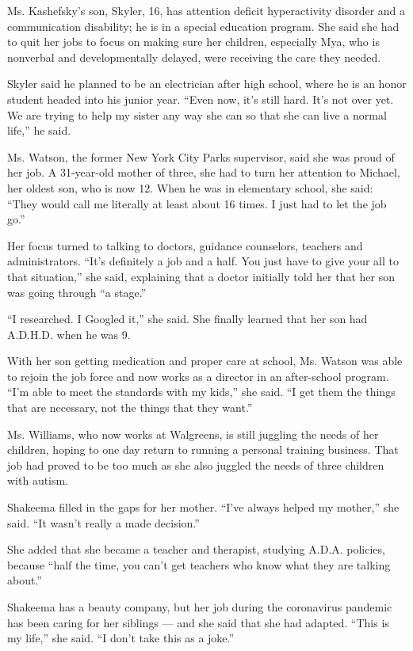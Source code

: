 Ms. Kashefsky's son, Skyler, 16, has attention deficit hyperactivity
disorder and a communication disability; he is in a special education
program. She said she had to quit her jobs to focus on making sure her
children, especially Mya, who is nonverbal and developmentally delayed,
were receiving the care they needed.

Skyler said he planned to be an electrician after high school, where he
is an honor student headed into his junior year. ``Even now, it's still
hard. It's not over yet. We are trying to help my sister any way she can
so that she can live a normal life,'' he said.

Ms. Watson, the former New York City Parks supervisor, said she was
proud of her job. A 31-year-old mother of three, she had to turn her
attention to Michael, her oldest son, who is now 12. When he was in
elementary school, she said: ``They would call me literally at least
about 16 times. I just had to let the job go.''

Her focus turned to talking to doctors, guidance counselors, teachers
and administrators. ``It's definitely a job and a half. You just have to
give your all to that situation,'' she said, explaining that a doctor
initially told her that her son was going through ``a stage.''

``I researched. I Googled it,'' she said. She finally learned that her
son had A.D.H.D. when he was 9.

With her son getting medication and proper care at school, Ms. Watson
was able to rejoin the job force and now works as a director in an
after-school program. ``I'm able to meet the standards with my kids,''
she said. ``I get them the things that are necessary, not the things
that they want.''

Ms. Williams, who now works at Walgreens, is still juggling the needs of
her children, hoping to one day return to running a personal training
business. That job had proved to be too much as she also juggled the
needs of three children with autism.

Shakeema filled in the gaps for her mother. ``I've always helped my
mother,'' she said. ``It wasn't really a made decision.''

She added that she became a teacher and therapist, studying A.D.A.
policies, because ``half the time, you can't get teachers who know what
they are talking about.''

Shakeema has a beauty company, but her job during the coronavirus
pandemic has been caring for her siblings --- and she said that she had
adapted. ``This is my life,'' she said. ``I don't take this as a joke.''

